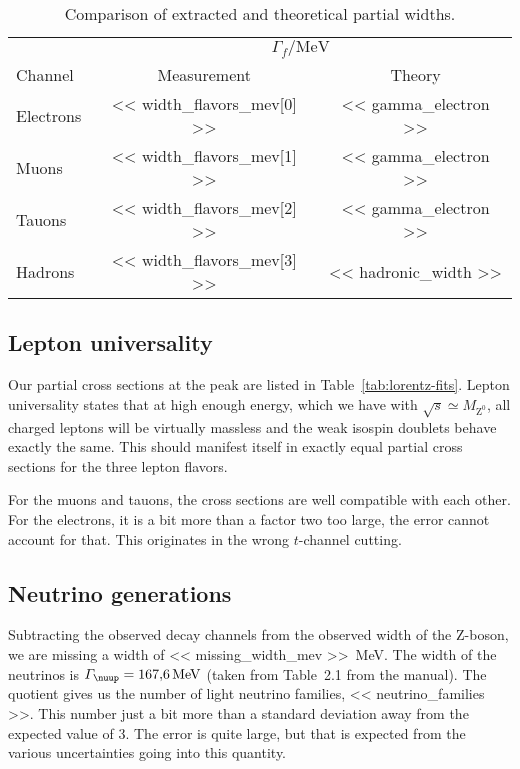 \documentclass[11pt, english, fleqn, DIV=15, headinclude, BCOR=2cm]{scrreprt}
\newcommand\MZ{M_{\mathrm Z^0}}
\begin{document}
\begin{table}
    \centering
    \begin{tabular}{lSS}
        \toprule
        &  \\
        \cmidrule(l){2-3}
        {Channel}
        & {Measurement}
        & {Theory}
        \\
        \midrule
        Electrons & << width_flavors_mev[0] >> & << gamma_electron >> \\
        Muons & << width_flavors_mev[1] >> & << gamma_electron >> \\
        Tauons & << width_flavors_mev[2] >> & << gamma_electron >> \\
        Hadrons & << width_flavors_mev[3] >> & << hadronic_width >> \\
        \bottomrule
    \end{tabular}
    \caption{%
        Comparison of extracted and theoretical partial widths.
    }
    \label{tab:cross_section_comparison}
\end{table}

\subsection{Lepton universality}

Our partial cross sections at the peak are listed in
Table~\ref{tab:lorentz-fits}. Lepton universality states that at high enough
energy, which we have with $\sqrt s \simeq \MZ$, all charged leptons will be
virtually massless and the weak isospin doublets behave exactly the same. This
should manifest itself in exactly equal partial cross sections for the three
lepton flavors.

For the muons and tauons, the cross sections are well compatible with each
other. For the electrons, it is a bit more than a factor two too large, the
error cannot account for that. This originates in the wrong $t$-channel
cutting.

\subsection{Neutrino generations}

Subtracting the observed decay channels from the observed width of the Z-boson,
we are missing a width of \SI{<< missing_width_mev >>}{\mega\electronvolt}. The
width of the neutrinos is $\Gamma_\nuup = \SI{167.6}{\mega\electronvolt}$
(taken from Table~2.1 from the manual). The quotient gives us the number of
light neutrino families, \num{<< neutrino_families >>}. This number just a bit
more than a standard deviation away from the expected value of 3. The error is
quite large, but that is expected from the various uncertainties going into
this quantity.
\end{document}
